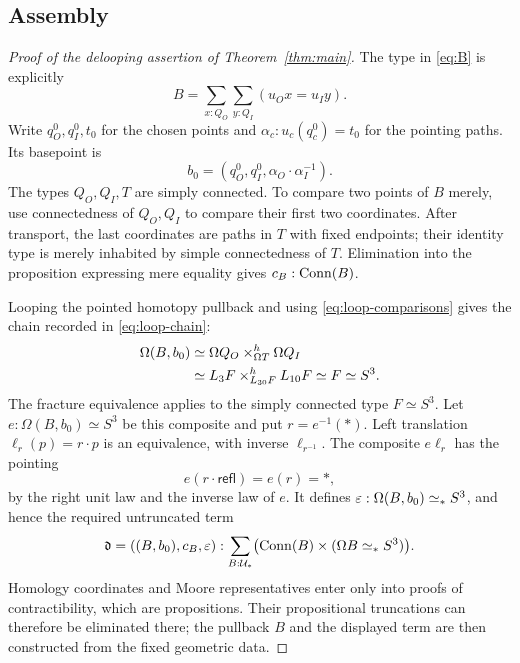 \subsection{Assembly}\label{sec:assembly}
\begin{proof}[Proof of the delooping assertion of Theorem~\ref{thm:main}]
The type in \eqref{eq:B} is explicitly
\[
B=\sum_{x:Q_O}\sum_{y:Q_I}(u_Ox=u_Iy).
\]
Write $q_O^0,q_I^0,t_0$ for the chosen points and $\alpha_c:u_c(q_c^0)=t_0$ for the pointing paths. Its basepoint is
\[
b_0=(q_O^0,q_I^0,\alpha_O\cdot\alpha_I^{-1}).
\]
The types $Q_O,Q_I,T$ are simply connected. To compare two points of $B$ merely, use connectedness of $Q_O,Q_I$ to compare their first two coordinates. After transport, the last coordinates are paths in $T$ with fixed endpoints; their identity type is merely inhabited by simple connectedness of $T$. Elimination into the proposition expressing mere equality gives $c_B:\operatorname{Conn}(B)$.

Looping the pointed homotopy pullback and using \eqref{eq:loop-comparisons} gives the chain recorded in \eqref{eq:loop-chain}:
\begin{align*}
\Omega(B,b_0)
&\simeq\Omega Q_O\mathbin{\times}^{h}_{\Omega T}\Omega Q_I\\
&\simeq L_3F\mathbin{\times}^{h}_{L_{30}F}L_{10}F
 \simeq F\simeq S^3.
\end{align*}
The fracture equivalence applies to the simply connected type $F\simeq S^3$. Let $e:\Omega(B,b_0)\simeq S^3$ be this composite and put $r=e^{-1}(*)$. Left translation $\ell_r(p)=r\cdot p$ is an equivalence, with inverse $\ell_{r^{-1}}$. The composite $e\ell_r$ has the pointing
\[
e(r\cdot\mathsf{refl})=e(r)=*,
\]
by the right unit law and the inverse law of $e$. It defines $\varepsilon:\Omega(B,b_0)\simeq_* S^3$, and hence the required untruncated term
\[
\mathfrak d=((B,b_0),c_B,\varepsilon):
\sum_{B:\mathcal U_*}\bigl(\operatorname{Conn}(B)\times(\Omega B\simeq_* S^3)\bigr).
\]
Homology coordinates and Moore representatives enter only into proofs of contractibility, which are propositions. Their propositional truncations can therefore be eliminated there; the pullback $B$ and the displayed term are then constructed from the fixed geometric data.
\end{proof}
